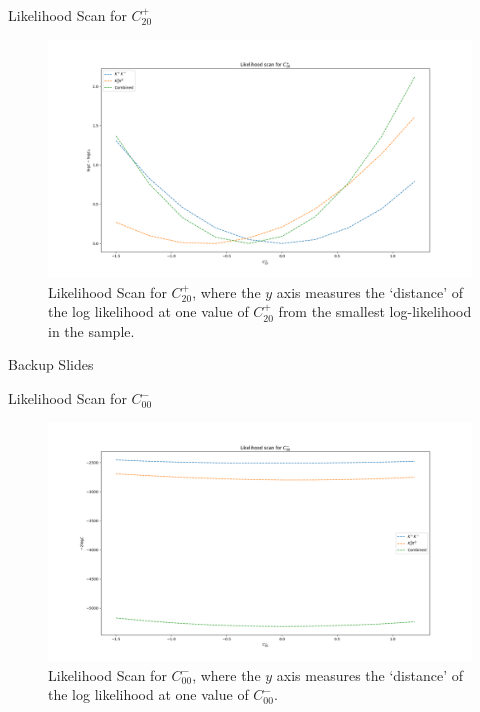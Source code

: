 \begin{frame}{Likelihood Scan for $C_{20}^{+}$}
\begin{figure}
    \centering
        \includegraphics[width=\textwidth]{2020_04_23/figs/P20_Norm.png}
    \caption{Likelihood Scan for $C_{20}^{+}$, where the $y$ axis measures the `distance' of the log likelihood at one value of $C_{20}^{+}$ from the smallest log-likelihood in the sample.}
    \label{fig:scanCP20}
\end{figure}
\end{frame}

\begin{frame}
Backup Slides
\end{frame}

\begin{frame}{Likelihood Scan for $C_{00}^{-}$}
\begin{figure}
    \centering
        \includegraphics[width=\textwidth]{2020_04_23/figs/M00.png}
    \caption{Likelihood Scan for $C_{00}^{-}$, where the $y$ axis measures the `distance' of the log likelihood at one value of $C_{00}^{-}$.}
    \label{fig:scanCM01}
\end{figure}
\end{frame}

